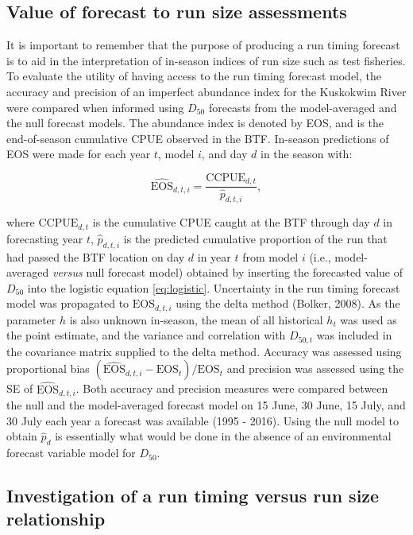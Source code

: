 \documentclass[12pt,]{book}
\theoremstyle{definition}
\theoremstyle{definition}
\theoremstyle{definition}
\theoremstyle{remark}
\begin{document}
\subsection{Value of forecast to run size
assessments}\label{value-of-forecast-to-run-size-assessments}

It is important to remember that the purpose of producing a run timing
forecast is to aid in the interpretation of in-season indices of run
size such as test fisheries. To evaluate the utility of having access to
the run timing forecast model, the accuracy and precision of an
imperfect abundance index for the Kuskokwim River were compared when
informed using \(D_{50}\) forecasts from the model-averaged and the null
forecast models. The abundance index is denoted by EOS, and is the
end-of-season cumulative CPUE observed in the BTF. In-season predictions
of EOS were made for each year \(t\), model \(i\), and day \(d\) in the
season with:

\begin{equation}
  \widehat{\text{EOS}}_{d,t,i}=\frac{\text{CCPUE}_{d,t}}{\hat{p}_{d,t,i}},
\label{eq:eos}
\end{equation}

where \(\text{CCPUE}_{d,t}\) is the cumulative CPUE caught at the BTF
through day \(d\) in forecasting year \(t\), \(\hat{p}_{d,t,i}\) is the
predicted cumulative proportion of the run that had passed the BTF
location on day \(d\) in year \(t\) from model \(i\) (i.e.,
model-averaged \emph{versus} null forecast model) obtained by inserting
the forecasted value of \(D_{50}\) into the logistic equation
\eqref{eq:logistic}. Uncertainty in the run timing forecast model was
propagated to \(\text{EOS}_{d,t,i}\) using the delta method (Bolker,
2008). As the parameter \(h\) is also unknown in-season, the mean of all
historical \(h_t\) was used as the point estimate, and the variance and
correlation with \(D_{50,t}\) was included in the covariance matrix
supplied to the delta method. Accuracy was assessed using proportional
bias \((\widehat{\text{EOS}}_{d,t,i} - \text{EOS}_t)/\text{EOS}_t\) and
precision was assessed using the SE of \(\widehat{\text{EOS}}_{d,t,i}\).
Both accuracy and precision measures were compared between the null and
the model-averaged forecast model on 15 June, 30 June, 15 July, and 30
July each year a forecast was available (1995 - 2016). Using the null
model to obtain \(\hat{p}_d\) is essentially what would be done in the
absence of an environmental forecast variable model for \(D_{50}\).

\subsection{Investigation of a run timing versus run size
relationship}\label{investigation-of-a-run-timing-versus-run-size-relationship}
\end{document}
